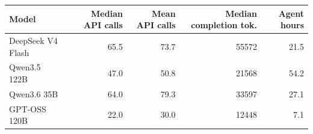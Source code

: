 \begin{tabular}{lrrrr}
\toprule
\textbf{Model} & \textbf{Median API calls} & \textbf{Mean API calls} & \textbf{Median completion tok.} & \textbf{Agent hours} \\
\midrule
DeepSeek V4 Flash & 65.5 & 73.7 & 55572 & 21.5 \\
Qwen3.5 122B & 47.0 & 50.8 & 21568 & 54.2 \\
Qwen3.6 35B & 64.0 & 79.3 & 33597 & 27.1 \\
GPT-OSS 120B & 22.0 & 30.0 & 12448 & 7.1 \\
\bottomrule
\end{tabular}

